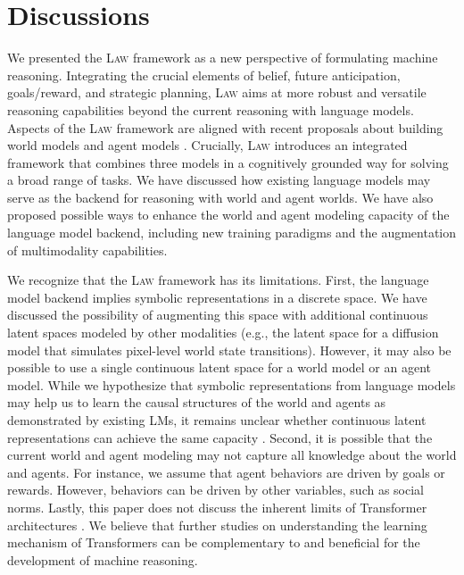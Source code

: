 \documentclass{article}
\def\modelname{\textsc{Law}\xspace}
\newcommand{\hzt}[1]{{\color{red}{[ZT: #1]}}}
\begin{document}










\section{Discussions}

We presented the \modelname framework as a new perspective of formulating machine reasoning. Integrating the crucial elements of belief, future anticipation, goals/reward, and strategic planning, \modelname aims at more robust and versatile reasoning capabilities beyond the current reasoning with language models.
Aspects of the \modelname framework are aligned with recent proposals about building world models \citep{lecun2022path} and agent models \citep{andreas2022language}. Crucially, \modelname introduces an integrated framework that combines three models in a cognitively grounded way for solving a broad range of tasks. We have discussed how existing language models may serve as the backend for reasoning with world and agent worlds. We have also proposed possible ways to enhance the world and agent modeling capacity of the language model backend, including new training paradigms and the augmentation of multimodality capabilities.

We recognize that the \modelname framework has its limitations. First, the language model backend implies symbolic representations in a discrete space. We have discussed the possibility of augmenting this space with additional continuous latent spaces modeled by other modalities (e.g., the latent space for a diffusion model that simulates pixel-level world state transitions). However, it may also be possible to use a single continuous latent space for a world model or an agent model. While we hypothesize that symbolic representations from language models may help us to learn the causal structures of the world and agents as demonstrated by existing LMs, it remains unclear whether continuous latent representations can achieve the same capacity \citep{ha2018world, hafner2019learning, anand2019unsupervised, ermolov2020latent, lecun2022path}. Second, it is possible that the current world and agent modeling may not capture all knowledge about the world and agents. For instance, we assume that agent behaviors are driven by goals or rewards. However, behaviors can be driven by other variables, such as social norms. Lastly, this paper does not discuss the inherent limits of Transformer architectures \citep[e.g.,][]{dziri2023faith}. We believe that further studies on understanding the learning mechanism of Transformers can be complementary to and beneficial for the development of machine reasoning.





\clearpage

% 

\end{document}
